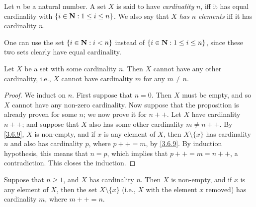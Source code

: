 \begin{definition}\label{3.6.5}
  Let \(n\) be a natural number.
  A set \(X\) is said to have \emph{cardinality} \(n\), iff it has equal cardinality with \(\{i \in \mathbf{N} : 1 \leq i \leq n\}\).
  We also say that \(X\) \emph{has \(n\) elements} iff it has cardinality \(n\).
\end{definition}

\begin{remark}\label{3.6.6}
  One can use the set \(\{i \in \mathbf{N} : i < n\}\) instead of \(\{i \in \mathbf{N} : 1 \leq i \leq n\}\), since these two sets clearly have equal cardinality.
\end{remark}

\setcounter{theorem}{7}
\begin{proposition}\label{3.6.8}
  Let \(X\) be a set with some cardinality \(n\).
  Then \(X\) cannot have any other cardinality, i.e., \(X\) cannot have cardinality \(m\) for any \(m \neq n\).
\end{proposition}

\begin{proof}
  We induct on \(n\).
  First suppose that \(n = 0\).
  Then \(X\) must be empty, and so \(X\) cannot have any non-zero cardinality.
  Now suppose that the proposition is already proven for some \(n\);
  we now prove it for \(n++\).
  Let \(X\) have cardinality \(n++\);
  and suppose that \(X\) also has some other cardinality \(m \neq n++\).
  By \cref{3.6.9}, \(X\) is non-empty, and if \(x\) is any element of \(X\), then \(X \setminus \{x\}\) has cardinality \(n\) and also has cardinality \(p\), where \(p++ = m\), by \cref{3.6.9}.
  By induction hypothesis, this means that \(n = p\), which implies that \(p++ = m = n++\), a contradiction.
  This closes the induction.
\end{proof}

\begin{lemma}\label{3.6.9}
  Suppose that \(n \geq 1\), and \(X\) has cardinality \(n\).
  Then \(X\) is non-empty, and if \(x\) is any element of \(X\), then the set \(X \setminus \{x\}\) (i.e., \(X\) with the element \(x\) removed) has cardinality \(m\), where \(m++ = n\).
\end{lemma}

